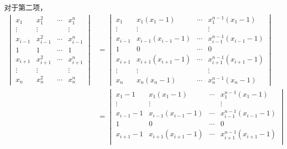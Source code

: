 \begin{exercise}
\begin{exgroup}
\begin{answer}
            对于第二项，
            \begin{align*}
                \begin{vmatrix}
                    x_1     & x_1^2     & \cdots & x_1^n     \\
                    \vdots  & \vdots    &        & \vdots    \\
                    x_{i-1} & x_{i-1}^2 & \cdots & x_{i-1}^n \\
                    1       & 1         & \cdots & 1         \\
                    x_{i+1} & x_{i+1}^2 & \cdots & x_{i+1}^n \\
                    \vdots  & \vdots    &        & \vdots    \\
                    x_n     & x_n^2     & \cdots & x_n^n
                \end{vmatrix}
                &= \begin{vmatrix}
                    x_1     & x_1 (x_1-1)         & \cdots & x_1^{n-1} (x_1-1)         \\
                    \vdots  & \vdots              &        & \vdots                    \\
                    x_{i-1} & x_{i-1} (x_{i-1}-1) & \cdots & x_{i-1}^{n-1} (x_{i-1}-1) \\
                    1       & 0                   & \cdots & 0                         \\
                    x_{i+1} & x_{i+1} (x_{i+1}-1) & \cdots & x_{i+1}^{n-1} (x_{i+1}-1) \\
                    \vdots  & \vdots              &        & \vdots                    \\
                    x_n     & x_n (x_n-1)         & \cdots & x_n^{n-1} (x_n-1)
                \end{vmatrix} \\
                &= \begin{vmatrix}
                    x_1-1     & x_1 (x_1-1)         & \cdots & x_1^{n-1} (x_1-1)         \\
                    \vdots    & \vdots              &        & \vdots                    \\
                    x_{i-1}-1 & x_{i-1} (x_{i-1}-1) & \cdots & x_{i-1}^{n-1} (x_{i-1}-1) \\
                    1         & 0                   & \cdots & 0                         \\
                    x_{i+1}-1 & x_{i+1} (x_{i+1}-1) & \cdots & x_{i+1}^{n-1} (x_{i+1}-1) \\

\end{vmatrix}
\end{align*}
\end{answer}
\end{exgroup}
\end{exercise}
